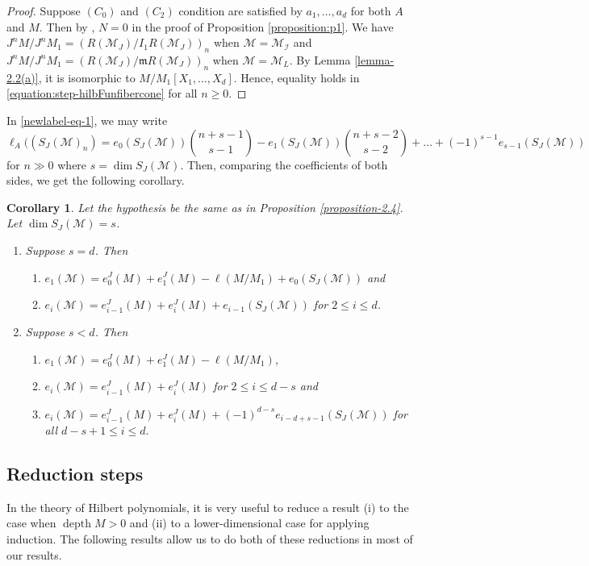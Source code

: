 \documentclass[11pt,reqno]{amsart}
\newtheorem{corollary}[theorem]{Corollary}
\theoremstyle{definition}
\newcommand{\m}{\mathfrak m}
\def\M{{\mathcal M}}
\def\I{{\mathcal I}}
\DeclareMathOperator{\depth}{depth}
\numberwithin{equation}{section}
\begin{document}
\begin{proof} Suppose $(C_0)$ and $(C_2)$ condition are satisfied by $a_1,\ldots,a_d$ for both $A$ and $M$. Then by \cite[Proposition 4.1]{trung-abs}, $N=0$ in the proof of Proposition \ref{proposition:p1}. We have $J^nM/J^n M_1= (R(\M_J)/I_1 R(\M_J))_n$ when $\M=\M_\I$ and $J^nM/J^n M_1= (R(\M_J)/\m R(\M_J))_n$ when $\M=\M_L$. By Lemma \ref{lemma-2.2(a)}, it is isomorphic to $M/M_1[X_1,\ldots,X_d]$.  Hence, equality holds in
	\eqref{equation:step-hilbFunfibercone} for all $n\geq 0.$
\end{proof}
In \eqref{newlabel-eq-1}, we may write
$$\ell_A((S_J(\M)_n)=e_0(S_J(\M))\binom{n+s-1}{s-1}-e_1(S_J(\M))\binom{n+s-2}{s-2}+\ldots+(-1)^{s-1}e_{s-1}(S_J(\M))$$
for $n\gg 0$ where $s=\dim S_J(\M)$. Then, comparing the coefficients of both sides, we get the following corollary.
\begin{corollary}\label{corr-2.5}
Let the hypothesis be the same as in Proposition \ref{proposition-2.4}. Let $\dim S_J(\M)=s$. 
	\begin{enumerate}[label=(\roman*)]
		\item Suppose $s=d$. Then 
		\begin{enumerate}
			\item $e_1(\M)=e_0^J(M)+e_1^J(M)-\ell(M/M_1)+e_0(S_J(\M))$ and 
			\item $e_i(\M)=e_{i-1}^J(M)+e_i^J(M)+e_{i-1}(S_J(\M))$ for $2\leq i\leq d$.
		\end{enumerate}
		\item Suppose $s<d$. Then 
		\begin{enumerate}
			\item $e_1(\M)=e_0^J(M)+e_1^J(M)-\ell(M/M_1)$,
			\item $e_i(\M)=e_{i-1}^J(M)+e_i^J(M)$ for $2\leq i\leq d-s$ and
			\item $e_i(\M)=e_{i-1}^J(M)+e_i^J(M)+(-1)^{d-s}e_{i-d+s-1}(S_J(\M))$ for all $d-s+1\leq i\leq d.$
		\end{enumerate}
	\end{enumerate}
\end{corollary}
\subsection{Reduction steps} In the theory of Hilbert polynomials, it is very useful to reduce a result (i) to the case when $\depth M>0$ and (ii) to a lower-dimensional case for applying induction. The following results allow us to do both of these reductions in most of our results.
\end{document}
